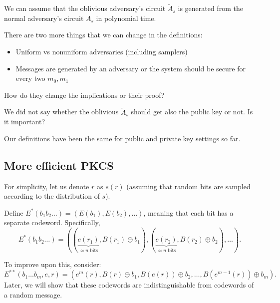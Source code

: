 \begin{remark}
	We can assume that the oblivious adversary's circuit $\tilde A_s$ is generated from the normal adversary's circuit  $A_s$ in polynomial time.
\end{remark}

\begin{exercise}
	There are two more things that we can change in the definitions:
	\begin{itemize}
		\item Uniform vs nonuniform adversaries (including samplers)
		\item Messages are generated by an adversary or the system should be secure for every two $m_0, m_1$
	\end{itemize}
	How do they change the implications or their proof?
\end{exercise}

\begin{exercise}
	We did not say whether the oblivious $\tilde A_s$ should get also the public key or not.
	Is it important?
\end{exercise}
\begin{remark}
	Our definitions have been the same for public and private key settings so far.
\end{remark}

\subsection{More efficient PKCS}

For simplicity, let us denote $r$ as $s(r)$ (assuming that random bits are sampled according to the distribution of $s$).

Define $E^*(b_1 b_2 \ldots) = (E(b_1), E(b_2), \ldots)$, meaning that each bit has a separate codeword. Specifically,
\[
	E^*(b_1 b_2 \ldots) = \left(\left(\underbrace{e(r_1)}_{\approx n \text{ bits}}, B(r_1) \oplus b_1\right), \left(\underbrace{e(r_2)}_{\approx n \text{ bits}}, B(r_2) \oplus b_2\right), \ldots\right).
\] 

To improve upon this, consider:
\[
	E^{**}(b_1 \ldots b_m, e, r) = \left(e^{m}(r), B(r) \oplus b_1, B(e(r)) \oplus b_2, \ldots, B(e^{m - 1}(r)) \oplus b_m\right).
\] 
Later, we will show that these codewords are indistinguishable from codewords of a random message.
